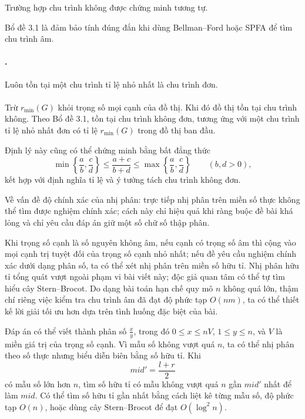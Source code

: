 \documentclass[11pt]{article}
\begin{document}
Trường hợp chu trình không được chứng minh tương tự.

Bổ đề 3.1 là đảm bảo tính đúng đắn khi dùng Bellman--Ford hoặc SPFA để tìm chu
trình âm.

\paragraph{.}
Luôn tồn tại một chu trình tỉ lệ nhỏ nhất là chu trình đơn.

\paragraph{}
Trừ \(r_{\min}(G)\) khỏi trọng số mọi cạnh của đồ thị. Khi đó đồ thị tồn tại
chu trình không. Theo Bổ đề 3.1, tồn tại chu trình không đơn, tương ứng với một
chu trình tỉ lệ nhỏ nhất đơn có tỉ lệ \(r_{\min}(G)\) trong đồ thị ban đầu.

Định lý này cũng có thể chứng minh bằng bất đẳng thức
\[
  \min\left\{\frac ab,\frac cd\right\}
  \le
  \frac{a+c}{b+d}
  \le
  \max\left\{\frac ab,\frac cd\right\}
  \qquad (b,d>0),
\]
kết hợp với định nghĩa tỉ lệ và ý tưởng tách chu trình không đơn.

Về vấn đề độ chính xác của nhị phân: trực tiếp nhị phân trên miền số thực không
thể tìm được nghiệm chính xác; cách này chỉ hiệu quả khi ràng buộc đề bài khá
lỏng và chỉ yêu cầu đáp án giữ một số chữ số thập phân.

Khi trọng số cạnh là số nguyên không âm, nếu cạnh có trọng số âm thì cộng vào
mọi cạnh trị tuyệt đối của trọng số cạnh nhỏ nhất; nếu đề yêu cầu nghiệm chính
xác dưới dạng phân số, ta có thể xét nhị phân trên miền số hữu tỉ. Nhị phân
hữu tỉ tổng quát vượt ngoài phạm vi bài viết này; độc giả quan tâm có thể tự
tìm hiểu cây Stern--Brocot. Do dạng bài toán hạn chế quy mô \(n\) không quá
lớn, thậm chí riêng việc kiểm tra chu trình âm đã đạt độ phức tạp \(O(nm)\),
ta có thể thiết kế lời giải tối ưu hơn dựa trên tình huống đặc biệt của bài.

Đáp án có thể viết thành phân số \(\frac xy\), trong đó \(0\le x\le nV\),
\(1\le y\le n\), và \(V\) là miền giá trị của trọng số cạnh. Vì mẫu số không
vượt quá \(n\), ta có thể nhị phân theo số thực nhưng biểu diễn biên bằng số
hữu tỉ. Khi
\[
  \mathit{mid}'=\frac{l+r}{2}
\]
có mẫu số lớn hơn \(n\), tìm số hữu tỉ có mẫu không vượt quá \(n\) gần
\(\mathit{mid}'\) nhất để làm \(\mathit{mid}\). Có thể tìm số hữu tỉ gần nhất
bằng cách liệt kê từng mẫu số, độ phức tạp \(O(n)\), hoặc dùng cây
Stern--Brocot để đạt \(O(\log^2 n)\).
\end{document}
